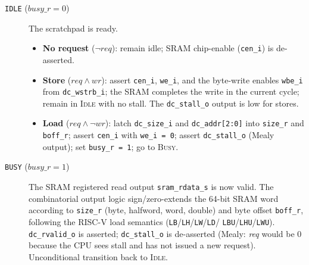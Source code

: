 \begin{description}

  \item[\texttt{IDLE} ($\mathit{busy\_r}{=}0$)]
    The scratchpad is ready.
    \begin{itemize}
      \item \textbf{No request} ($\neg\mathit{req}$): remain idle; SRAM
        chip-enable (\texttt{cen\_i}) is de-asserted.
      \item \textbf{Store} ($\mathit{req}{\wedge}\mathit{wr}$):
        assert \texttt{cen\_i}, \texttt{we\_i}, and the byte-write
        enables \texttt{wbe\_i} from \texttt{dc\_wstrb\_i}; the
        SRAM completes the write in the current cycle; remain in
        \textsc{Idle} with no stall.
        The \texttt{dc\_stall\_o} output is low for stores.
      \item \textbf{Load} ($\mathit{req}{\wedge}\neg\mathit{wr}$):
        latch \texttt{dc\_size\_i} and \texttt{dc\_addr[2:0]} into
        \texttt{size\_r} and \texttt{boff\_r}; assert \texttt{cen\_i}
        with \texttt{we\_i\,=\,0}; assert \texttt{dc\_stall\_o}
        (Mealy output); set \texttt{busy\_r\,=\,1}; go to \textsc{Busy}.
    \end{itemize}

  \item[\texttt{BUSY} ($\mathit{busy\_r}{=}1$)]
    The SRAM registered read output \texttt{sram\_rdata\_s} is now
    valid.
    The combinatorial output logic sign/zero-extends the 64-bit SRAM
    word according to \texttt{size\_r} (byte, halfword, word, double)
    and byte offset \texttt{boff\_r}, following the RISC-V load
    semantics (\texttt{LB}/\texttt{LH}/\texttt{LW}/\texttt{LD}/
    \texttt{LBU}/\texttt{LHU}/\texttt{LWU}).
    \texttt{dc\_rvalid\_o} is asserted; \texttt{dc\_stall\_o} is
    de-asserted (Mealy: \textit{req} would be 0 because the CPU sees
    stall and has not issued a new request).
    Unconditional transition back to \textsc{Idle}.

\end{description}
